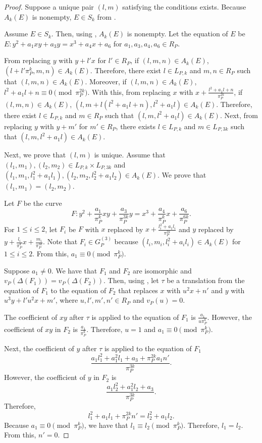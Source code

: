 \documentclass[10pt,a4paper]{amsart}
\begin{document}
\begin{proof}
Suppose a unique pair $(l,m)$ satisfying the conditions exists. Because $A_k(E)$ is nonempty, $E\in S_k$ from .

Assume $E\in S_k$. Then, using , $A_k(E)$ is nonempty. Let the equation of $E$ be $E:y^2+a_1xy+a_3y=x^3+a_4x+a_6$ for $a_1,a_3,a_4,a_6\in R_P$.

From replacing $y$ with $y+l'x$ for $l'\in R_P$, if $(l,m,n)\in A_k(E)$, $(l+l'\pi_P^{k}, m,n)\in A_k(E)$. Therefore, there exist $l\in L_{P,k}$ and $m,n\in R_P$ such that $(l,m,n)\in A_k(E)$. Moreover, if $(l,m,n)\in A_k(E)$, $l^2+a_1l+n\equiv 0\pmod{\pi_P^{2k}}$. With this, from replacing $x$ with $x+\frac{l^2+a_1l+n}{\pi_P^{2k}}$, if $(l,m,n)\in A_k(E)$, $(l,m+l(l^2+a_1l+n),l^2+a_1l)\in A_k(E)$. Therefore, there exist $l\in L_{P,k}$ and $m\in R_P$ such that $(l,m,l^2+a_1l)\in A_k(E)$. Next, from replacing $y$ with $y+m'$ for $m'\in R_P$, there exists $l\in L_{P,k}$ and $m\in L_{P,3k}$ such that $(l,m,l^2+a_1l)\in A_k(E)$.

Next, we prove that $(l,m)$ is unique. Assume that $(l_1,m_1), (l_2,m_2)\in L_{P,k}\times L_{P,3k}$ and $(l_1,m_1,l_1^2+a_1l_1), (l_2,m_2,l_2^2+a_1l_2) \in A_k(E)$. We prove that $(l_1,m_1)=(l_2,m_2)$.

Let $F$ be the curve 
\[
F:y^2+\frac{a_1}{\pi_P^k}xy+\frac{a_3}{\pi_P^{3k}}y=x^3+\frac{a_4}{\pi_P^k}x+\frac{a_6}{\pi_P^{6k}}.
\]
For $1\leq i\leq 2$, let $F_i$ be $F$ with $x$ replaced by $x+\frac{l_i^2+a_1l_i}{\pi_P^{2k}}$ and $y$ replaced by $y+\frac{l_i}{\pi_P^{k}}x+\frac{m_i}{\pi_P^{3k}}$. Note that $F_i\in G_P^{(3)}$ because $(l_i, m_i, l_i^2+a_il_i)\in A_k(E)$ for $1\leq i\leq 2$. From this, $a_1\equiv 0\pmod{\pi_P^k}$. 

Suppose $a_1\not=0$. We have that $F_1$ and $F_2$ are isomorphic and $v_P(\Delta(F_1))=v_P(\Delta(F_2))$. Then, using , let $\tau$ be a translation from the equation of $F_1$ to the equation of $F_2$ that replaces $x$ with $u^2x+n'$ and $y$ with $u^3y+l'u^2x+m'$, where $u,l',m',n'\in R_P$ and $v_P(u)=0$. 

The coefficient of $xy$ after $\tau$ is applied to the equation of $F_1$ is $\frac{a_1}{u\pi_P^k}$. However, the coefficient of $xy$ in $F_2$ is $\frac{a_1}{\pi_P^k}$. Therefore, $u=1$ and $a_1\equiv 0\pmod{\pi_P^k}$. 

Next, the coefficient of $y$ after $\tau$ is applied to the equation of $F_1$ \[
\frac{a_1l_1^2+a_1^2l_1+a_3+\pi_P^{2k}a_1n'}{\pi_P^{3k}}.
\]
However, the coefficient of $y$ in $F_2$ is
\[
\frac{a_1l_2^2+a_1^2l_2+a_3}{\pi_P^{3k}}.
\]
Therefore, 
\[
l_1^2+a_1l_1+\pi_P^{2k}n'=l_2^2+a_1l_2.
\]
Because $a_1\equiv 0\pmod{\pi_P^k}$, we have that $l_1\equiv l_2\pmod{\pi_P^k}$. Therefore, $l_1=l_2$. From this, $n'=0$.


\end{proof}
\end{document}
